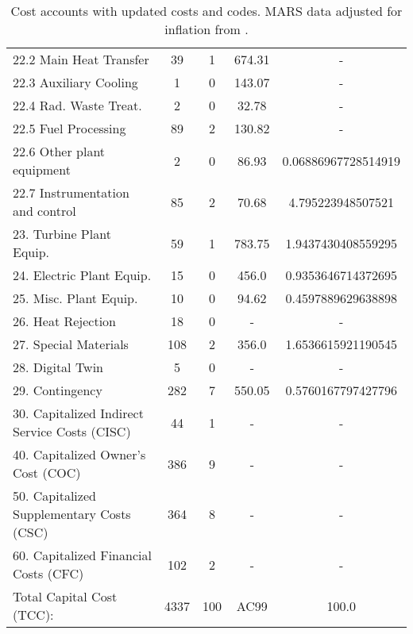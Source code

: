 \begin{table}[h!]
{\begin{tabular}{lcccc}
\hspace{10mm}22.2 Main Heat Transfer & 39 & 1 & 674.31 & - \\
\hspace{10mm}22.3 Auxiliary Cooling & 1 & 0 & 143.07 & - \\
\hspace{10mm}22.4 Rad. Waste Treat. & 2 & 0 & 32.78 & - \\
\hspace{10mm}22.5 Fuel Processing & 89 & 2 & 130.82 & - \\
\hspace{10mm}22.6 Other plant equipment & 2 & 0 & 86.93 & 0.06886967728514919 \\
\hspace{10mm}22.7 Instrumentation and control & 85 & 2 & 70.68 & 4.795223948507521 \\
\hspace{5mm}23. Turbine Plant Equip. & 59 & 1 & 783.75 & 1.9437430408559295 \\
\hspace{5mm}24. Electric Plant Equip. & 15 & 0 & 456.0 & 0.9353646714372695 \\
\hspace{5mm}25. Misc. Plant Equip. & 10 & 0 & 94.62 & 0.4597889629638898 \\
\hspace{5mm}26. Heat Rejection & 18 & 0 & - & - \\
\hspace{5mm}27. Special Materials & 108 & 2 & 356.0 & 1.6536615921190545 \\
\hspace{5mm}28. Digital Twin & 5 & 0 & - & - \\
\hspace{5mm}29. Contingency & 282 & 7 & 550.05 & 0.5760167797427796 \\
30. Capitalized Indirect Service Costs (CISC) & 44 & 1 & - & - \\
40. Capitalized Owner’s Cost (COC) & 386 & 9 & - & - \\
50. Capitalized Supplementary Costs (CSC) & 364 & 8 & - & - \\
60. Capitalized Financial Costs (CFC) & 102 & 2 & - & - \\
\hline
Total Capital Cost (TCC): & 4337 & 100 & AC99 & 100.0 \\
\hline
\end{tabular}
}
\caption{Cost accounts with updated costs and codes. MARS data adjusted for inflation from \cite{gordon1986mirror}.}
\label{tab:costsupdatedcodes}
\end{table}



